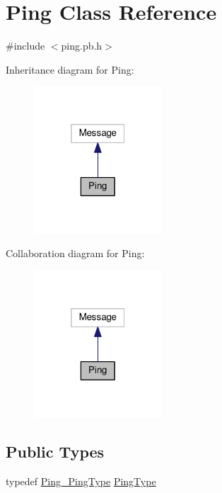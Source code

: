 \hypertarget{class_ping}{}\section{Ping Class Reference}
\label{class_ping}


{\ttfamily \#include $<$ping.\+pb.\+h$>$}



Inheritance diagram for Ping\+:\nopagebreak
\begin{figure}[H]
\begin{center}
\leavevmode
\includegraphics[width=136pt]{class_ping__inherit__graph}
\end{center}
\end{figure}


Collaboration diagram for Ping\+:\nopagebreak
\begin{figure}[H]
\begin{center}
\leavevmode
\includegraphics[width=136pt]{class_ping__coll__graph}
\end{center}
\end{figure}
\subsection*{Public Types}
\begin{DoxyCompactItemize}
\item 
typedef \hyperlink{ping_8pb_8h_a4b13f38feb620891e72b30e36aaaf35b}{Ping\+\_\+\+Ping\+Type} \hyperlink{class_ping_acc3eb96e81e502a66bab5fae841da9ab}{Ping\+Type}
\end{DoxyCompactItemize}

